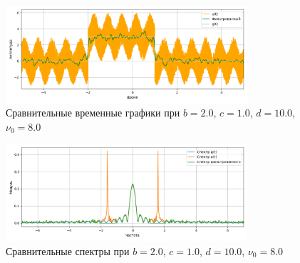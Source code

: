 \documentclass[a4paper]{article}
\begin{document}
\begin{figure}[H]
    \centering
    \includegraphics[width=0.8\textwidth]{src/npf/time_2.0_1.0_10.0_8.0.png}
    \caption{Сравнительные временные графики при $b=2.0$, $c=1.0$, $d=10.0$, $\nu_0=8.0$}
\end{figure}
\begin{figure}[H]
    \centering
    \includegraphics[width=0.8\textwidth]{src/npf/spec_2.0_1.0_10.0_8.0.png}
    \caption{Сравнительные спектры при $b=2.0$, $c=1.0$, $d=10.0$, $\nu_0=8.0$}
\end{figure}
\end{document}
